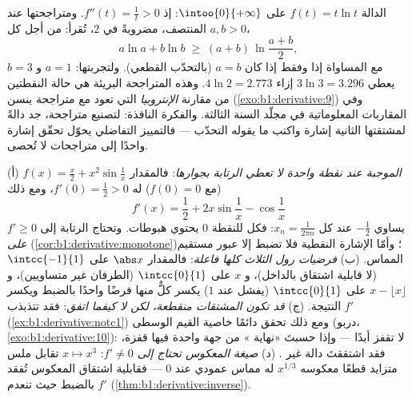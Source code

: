 \begin{example}\label{ex:b1:derivative:xlnx}
الدالة $f(t) = t\ln t$  على $\intoo{0}{+\infty}$:
إذ $f''(t) = \frac1t > 0$. ومتراجحتها عند المنتصف، مضروبةً في
$2$، تُقرأ: من أجل كل $a, b > 0$،
\[
a\ln a + b\ln b \;\geq\; (a + b)\,\ln\frac{a + b}{2} ,
\]
مع المساواة إذا وفقط إذا كان $a = b$ (بالتحدّب القطعي). ولتجربتها: $a =
1$ و $b = 3$ يعطي $3\ln 3 = 3.296$ إزاء $4\ln 2 = 2.773$.
وهذه المتراجحة البريئة هي حالة النقطتين من مقارنة
\emph{الإنتروبيا} التي تعود مع متراجحة ينسن
(\cref{exo:b1:derivative:9}) وفي المقاربات
المعلوماتية في مجلّد السنة الثالثة. والفكرة
النافذة: لتصنيع متراجحة، جد دالةً
لمشتقتها الثانية إشارة واكتب ما يقوله التحدّب
--- فالتمييز التفاضلي يحوّل تحقّق إشارة واحدًا
إلى متراجحات لا تُحصى.
\end{example}

\begin{remark}
(أ) \emph{ الموجبة عند نقطة واحدة لا تعطي
الرتابة بجوارها}: فالمقدار $f(x) = \frac x2 + x^2\sin\frac1x$ (مع
$f(0) = 0$) له $f'(0) = \frac12 > 0$، ومع ذلك
\[
f'(x) = \frac12 + 2x\sin\frac1x - \cos\frac1x
\]
يساوي $-\frac12$ عند كل $x_n = \frac{1}{2\pi n}$: فكل
 للنقطة $0$ يحتوي هبوطات. وتحتاج الرتابة إلى $f'
\geq 0$ \emph{على }
(\cref{cor:b1:derivative:monotone})؛ وأمّا الإشارة النقطية فلا
تضبط إلا عبور مستقيم المماس. (ب) \emph{فرضيات رول
الثلاث كلها فاعلة}: فالمقدار $\abs x$ على $\intcc{-1}{1}$
(لا قابلية اشتقاق بالداخل)، و $x$ على $\intcc{0}{1}$ (الطرفان غير
متساويين)، و $x - \lfloor x\rfloor$ على $\intcc{0}{1}$ (يفشل 
عند $1$) يكسر كلٌّ منها فرضًا واحدًا بالضبط ويكسر
النتيجة. (ج) \emph{قد تكون المشتقات منقطعة، لكن
لا كيفما اتفق}: فقد تتذبذب $f'$
(\cref{ex:b1:derivative:notc1}) ومع ذلك تحقق دائمًا
خاصية القيم الوسطى (دربو،
\cref{exo:b1:derivative:10}):  لا تقفز أبدًا --- وإذا
حسبتَ «نهاية » من جهة واحدة فيها قفزة، فقد
اشتققتَ دالة غير . (د) \emph{صيغة
المعكوس تحتاج إلى $f' \neq 0$}:  $x \mapsto x^3$ تقابل ملس
متزايد قطعًا معكوسه $x^{1/3}$ له مماس
عمودي عند $0$ --- فقابلية اشتقاق المعكوس
تُفقد بالضبط حيث تنعدم $f'$
(\cref{thm:b1:derivative:inverse}).
\end{remark}

